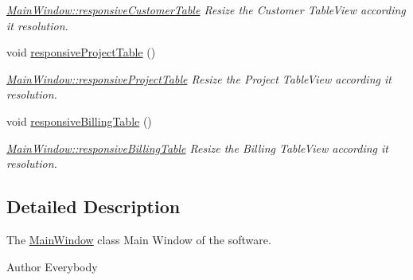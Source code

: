 \begin{DoxyCompactItemize}
\begin{DoxyCompactList}\small\item\em \hyperlink{classGui_1_1MainWindow_a0bf829effb9cb3e42ba063335a15cf3d}{Main\-Window\-::responsive\-Customer\-Table} Resize the Customer Table\-View according it resolution. \end{DoxyCompactList}\item 
\hypertarget{classGui_1_1MainWindow_af7402e6aa57ddf139ba82fb49c497cab}{void \hyperlink{classGui_1_1MainWindow_af7402e6aa57ddf139ba82fb49c497cab}{responsive\-Project\-Table} ()}\label{classGui_1_1MainWindow_af7402e6aa57ddf139ba82fb49c497cab}

\begin{DoxyCompactList}\small\item\em \hyperlink{classGui_1_1MainWindow_af7402e6aa57ddf139ba82fb49c497cab}{Main\-Window\-::responsive\-Project\-Table} Resize the Project Table\-View according it resolution. \end{DoxyCompactList}\item 
\hypertarget{classGui_1_1MainWindow_aff185fab5a7499468d8523d4db1592c9}{void \hyperlink{classGui_1_1MainWindow_aff185fab5a7499468d8523d4db1592c9}{responsive\-Billing\-Table} ()}\label{classGui_1_1MainWindow_aff185fab5a7499468d8523d4db1592c9}

\begin{DoxyCompactList}\small\item\em \hyperlink{classGui_1_1MainWindow_aff185fab5a7499468d8523d4db1592c9}{Main\-Window\-::responsive\-Billing\-Table} Resize the Billing Table\-View according it resolution. \end{DoxyCompactList}\end{DoxyCompactItemize}


\subsection{Detailed Description}
The \hyperlink{classGui_1_1MainWindow}{Main\-Window} class Main Window of the software. 

\begin{DoxyAuthor}{Author}
Everybody 
\end{DoxyAuthor}


